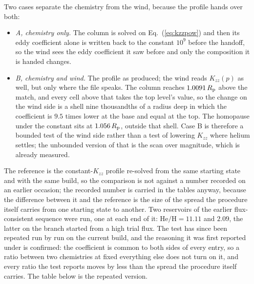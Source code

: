 \documentclass[english,a4paper]{my_memo}
\begin{document}
Two cases separate the chemistry from the wind, because the profile hands
over both:
\begin{itemize}\itemsep0.2ex
\item \emph{A, chemistry only.} The column is solved on
      Eq.~(\ref{eq:kzzpow}) and then its eddy coefficient alone is written
      back to the constant $10^{9}$ before the handoff, so the wind sees the
      eddy coefficient it saw before and only the composition it is handed
      changes.
\item \emph{B, chemistry and wind.} The profile as produced; the wind reads
      $K_{zz}(p)$ as well, but only where the file speaks. The column
      reaches $1.0091\,R_{\rm p}$ above the match, and every cell above that
      takes the top level's value, so the change on the wind side is a shell
      nine thousandths of a radius deep in which the coefficient is $9.5$
      times lower at the base and equal at the top. The homopause under the
      constant sits at $1.056\,R_{\rm p}$, outside that shell. Case B is
      therefore a bounded test of the wind side rather than a test of
      lowering $K_{zz}$ where helium settles; the unbounded version of that
      is the scan over magnitude, which is already measured.
\end{itemize}
%
The reference is the constant-$K_{zz}$ profile re-solved from the same
starting state and with the same build, so the comparison is not against a
number recorded on an earlier occasion; the recorded number is carried in the
tables anyway, because the difference between it and the reference is the
size of the spread the procedure itself carries from one starting state to
another. Two reservoirs of the earlier flux-consistent sequence were run, one
at each end of it: $\mathrm{He/H} = 11.11$ and $2.09$, the latter on the
branch started from a high trial flux. The test has since been repeated run
by run on the current build, and the reasoning it was first reported under is
confirmed: the coefficient is common to both sides of every entry, so a ratio
between two chemistries at fixed everything else does not turn on it, and
every ratio the test reports moves by less than the spread the procedure
itself carries. The table below is the repeated version.
\end{document}
